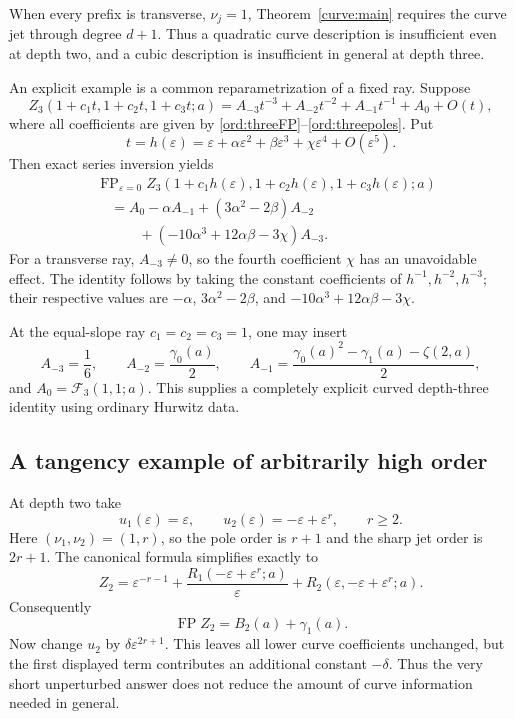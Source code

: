 \documentclass[11pt,letterpaper]{article}
\numberwithin{equation}{section}
\theoremstyle{definition}
\theoremstyle{remark}
\DeclareMathOperator{\FP}{FP}
\newcommand{\eps}{\varepsilon}
\begin{document}
When every prefix is transverse, $\nu_j=1$, Theorem~\ref{curve:main}
requires the curve jet through degree $d+1$. Thus a quadratic curve
description is insufficient even at depth two, and a cubic description
is insufficient in general at depth three.

An explicit example is a common reparametrization of a fixed ray.
Suppose
\[
 Z_3(1+c_1t,1+c_2t,1+c_3t;a)
 =A_{-3}t^{-3}+A_{-2}t^{-2}+A_{-1}t^{-1}+A_0+O(t),
\]
where all coefficients are given by
\eqref{ord:threeFP}--\eqref{ord:threepoles}. Put
\[
 t=h(\eps)=\eps+\alpha\eps^2+\beta\eps^3+
                         \chi\eps^4+O(\eps^5).
\]
Then exact series inversion yields
\begin{equation}\label{curve:cubicreparam}
 \boxed{\begin{aligned}
 &\FP_{\eps=0}Z_3(1+c_1h(\eps),1+c_2h(\eps),1+c_3h(\eps);a)\\
 &\quad=A_0-\alpha A_{-1}+(3\alpha^2-2\beta)A_{-2}\\
 &\qquad\quad+(-10\alpha^3+12\alpha\beta-3\chi)A_{-3}.
 \end{aligned}}
\end{equation}
For a transverse ray, $A_{-3}\ne0$, so the fourth coefficient $\chi$
has an unavoidable effect. The identity follows by taking the
constant coefficients of $h^{-1},h^{-2},h^{-3}$; their respective
values are $-\alpha$, $3\alpha^2-2\beta$, and
$-10\alpha^3+12\alpha\beta-3\chi$.

At the equal-slope ray $c_1=c_2=c_3=1$, one may insert
\[
 A_{-3}=\frac16,\qquad A_{-2}=\frac{\gamma_0(a)}2,\qquad
 A_{-1}=\frac{\gamma_0(a)^2-\gamma_1(a)-\zeta(2,a)}2,
\]
and $A_0=\mathcal F_3(1,1;a)$. This supplies a completely explicit
curved depth-three identity using ordinary Hurwitz data.

\subsection{A tangency example of arbitrarily high order}

At depth two take
\[
 u_1(\eps)=\eps,\qquad u_2(\eps)=-\eps+\eps^r,
 \qquad r\ge2.
\]
Here $(\nu_1,\nu_2)=(1,r)$, so the pole order is $r+1$ and the
sharp jet order is $2r+1$. The canonical formula simplifies exactly to
\[
 Z_2=\eps^{-r-1}+\frac{R_1(-\eps+\eps^r;a)}\eps
                  +R_2(\eps,-\eps+\eps^r;a).
\]
Consequently
\begin{equation}\label{curve:tangentexample}
 \FP Z_2=B_2(a)+\gamma_1(a).
\end{equation}
Now change $u_2$ by $\delta\eps^{2r+1}$. This leaves all lower curve
coefficients unchanged, but the first displayed term contributes an
additional constant $-\delta$. Thus the very short unperturbed answer
does not reduce the amount of curve information needed in general.
\end{document}
